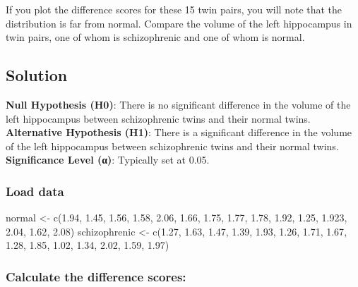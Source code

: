 \documentclass[
]{article}
\newenvironment{Shaded}{\begin{snugshade}}{\end{snugshade}}
\newcommand{\FloatTok}[1]{\textcolor[rgb]{0.00,0.00,0.81}{#1}}
\newcommand{\FunctionTok}[1]{\textcolor[rgb]{0.00,0.00,0.00}{#1}}
\newcommand{\NormalTok}[1]{#1}
\newcommand{\OtherTok}[1]{\textcolor[rgb]{0.56,0.35,0.01}{#1}}
\begin{document}
If you plot the difference scores for these 15 twin pairs, you will note
that the distribution is far from normal. Compare the volume of the left
hippocampus in twin pairs, one of whom is schizophrenic and one of whom
is normal.

\hypertarget{solution-6}{%
\subsection{Solution}\label{solution-6}}

\textbf{Null Hypothesis (H0)}: There is no significant difference in the
volume of the left hippocampus between schizophrenic twins and their
normal twins. \textbf{Alternative Hypothesis (H1)}: There is a
significant difference in the volume of the left hippocampus between
schizophrenic twins and their normal twins. \textbf{Significance Level
(α)}: Typically set at 0.05.

\hypertarget{load-data-6}{%
\subsubsection{Load data}\label{load-data-6}}

\begin{Shaded}
\begin{Highlighting}[]
\NormalTok{normal }\OtherTok{\textless{}{-}} \FunctionTok{c}\NormalTok{(}\FloatTok{1.94}\NormalTok{, }\FloatTok{1.45}\NormalTok{, }\FloatTok{1.56}\NormalTok{, }\FloatTok{1.58}\NormalTok{, }\FloatTok{2.06}\NormalTok{, }\FloatTok{1.66}\NormalTok{, }\FloatTok{1.75}\NormalTok{, }\FloatTok{1.77}\NormalTok{, }\FloatTok{1.78}\NormalTok{, }\FloatTok{1.92}\NormalTok{, }\FloatTok{1.25}\NormalTok{, }\FloatTok{1.923}\NormalTok{, }\FloatTok{2.04}\NormalTok{, }\FloatTok{1.62}\NormalTok{, }\FloatTok{2.08}\NormalTok{)}
\NormalTok{schizophrenic }\OtherTok{\textless{}{-}} \FunctionTok{c}\NormalTok{(}\FloatTok{1.27}\NormalTok{, }\FloatTok{1.63}\NormalTok{, }\FloatTok{1.47}\NormalTok{, }\FloatTok{1.39}\NormalTok{, }\FloatTok{1.93}\NormalTok{, }\FloatTok{1.26}\NormalTok{, }\FloatTok{1.71}\NormalTok{, }\FloatTok{1.67}\NormalTok{, }\FloatTok{1.28}\NormalTok{, }\FloatTok{1.85}\NormalTok{, }\FloatTok{1.02}\NormalTok{, }\FloatTok{1.34}\NormalTok{, }\FloatTok{2.02}\NormalTok{, }\FloatTok{1.59}\NormalTok{, }\FloatTok{1.97}\NormalTok{)}
\end{Highlighting}
\end{Shaded}

\hypertarget{calculate-the-difference-scores}{%
\subsubsection{Calculate the difference
scores:}\label{calculate-the-difference-scores}}
\end{document}
